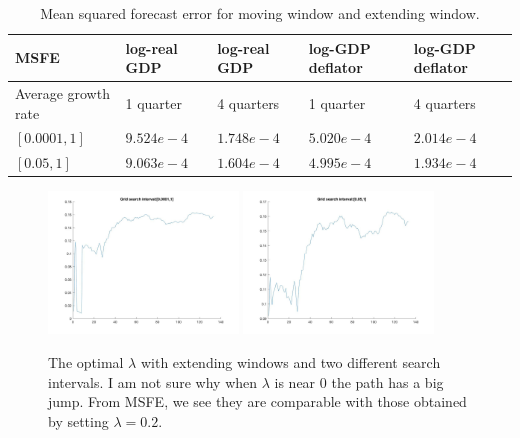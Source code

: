 \documentclass[11pt, oneside]{article}   	%
\begin{document}
\begin{enumerate}[(1)]
\begin{table}[!ht]
\center
\captionsetup{width=0.8\textwidth}
\begin{tabularx}{0.8\textwidth}{|X|X|X|X|X|} \hline 
MSFE & log-real GDP & log-real GDP & log-GDP deflator & log-GDP deflator \\ \hline
 Average growth rate & 1 quarter & 4 quarters & 1 quarter & 4 quarters \\ \hline
 $[0.0001,1]$ & $9.524e-4$ & $1.748e-4$ & $5.020e-4$ & $2.014e-4$ \\ \hline 
  $[0.05,1]$ & $9.063e-4$ & $1.604e-4$ & $4.995e-4$ & $1.934e-4$ \\ \hline 
 \end{tabularx} 
\caption{Mean squared forecast error for moving window and extending window.}
\label{table:MSFE_minne_prior}
\end{table}
\begin{figure}[!ht]
\begin{center}
\includegraphics[width = 0.45\textwidth]{lambda_opt_1.jpg}
\includegraphics[width = 0.45\textwidth]{lambda_opt_2.jpg}
\captionsetup{width=0.8\textwidth}
\caption{The optimal $ \lambda$ with extending windows and two different search intervals. I am not sure why when $ \lambda$ is near $0$ the path has a big jump. From MSFE, we see they are comparable with those obtained by setting $ \lambda = 0.2$.}
\label{fig:opt_lambda}
\end{center}
\end{figure}
\end{enumerate}
\end{document}
